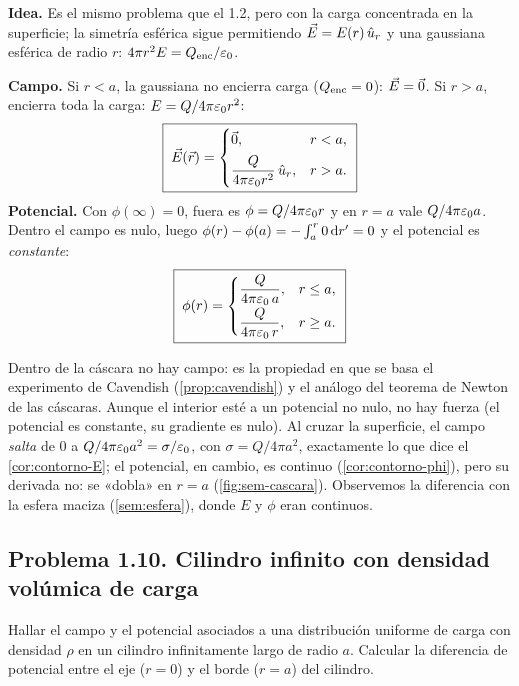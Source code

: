 \begin{resolucion}
\textbf{Idea.} Es el mismo problema que el 1.2, pero con la carga concentrada en la superficie; la simetría esférica sigue permitiendo $\vec{E}=E(r)\,\hat{u}_{r}$ y una gaussiana esférica de radio $r$: $4\pi r^{2}E=Q_{\mathrm{enc}}/\varepsilon_{0}$.

\textbf{Campo.} Si $r<a$, la gaussiana no encierra carga ($Q_{\mathrm{enc}}=0$): $\vec{E}=\vec{0}$. Si $r>a$, encierra toda la carga: $E=Q/4\pi\varepsilon_{0} r^{2}$:
\[
  \boxed{\;\vec{E}(\vec{r})=\begin{cases}\vec{0},&r<a,\\[4pt]\dfrac{Q}{4\pi\varepsilon_{0} r^{2}}\,\hat{u}_{r},&r>a.\end{cases}\;}
\]
\textbf{Potencial.} Con $\phi(\infty)=0$, fuera es $\phi=Q/4\pi\varepsilon_{0} r$ y en $r=a$ vale $Q/4\pi\varepsilon_{0} a$. Dentro el campo es nulo, luego $\phi(r)-\phi(a)=-\int_a^r0\,\mathrm{d} r'=0$ y el potencial es \emph{constante}:
\[
  \boxed{\;\phi(r)=\begin{cases}\dfrac{Q}{4\pi\varepsilon_{0}\,a},&r\le a,\\[6pt]\dfrac{Q}{4\pi\varepsilon_{0}\,r},&r\ge a.\end{cases}\;}
\]
\end{resolucion}

\begin{observacion}
Dentro de la cáscara no hay campo: es la propiedad en que se basa el experimento de Cavendish (\cref{prop:cavendish}) y el análogo del teorema de Newton de las cáscaras. Aunque el interior esté a un potencial no nulo, no hay fuerza (el potencial es constante, su gradiente es nulo).
Al cruzar la superficie, el campo \emph{salta} de $0$ a $Q/4\pi\varepsilon_{0} a^{2}=\sigma/\varepsilon_{0}$, con $\sigma=Q/4\pi a^{2}$, exactamente lo que dice el \cref{cor:contorno-E}; el potencial, en cambio, es continuo (\cref{cor:contorno-phi}), pero su derivada no: se «dobla» en $r=a$ (\cref{fig:sem-cascara}).
Observemos la diferencia con la esfera maciza (\cref{sem:esfera}), donde $E$ y $\phi$ eran continuos.
\end{observacion}



\subsection{Problema 1.10. Cilindro infinito con densidad volúmica de carga}\label{sem:cilindro}
\begin{ejercicio}\label{ejer:cilindro}
Hallar el campo y el potencial asociados a una distribución uniforme de carga con densidad $\rho$ en un cilindro infinitamente largo de radio $a$. Calcular la diferencia de potencial entre el eje ($r=0$) y el borde ($r=a$) del cilindro.
\end{ejercicio}

